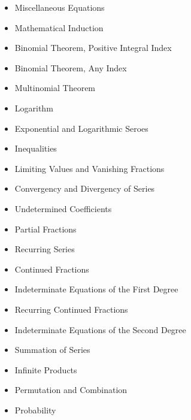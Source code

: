 \documentclass[aspectratio=169]{beamer}
\begin{document}
\begin{frame}
	\begin{itemize}
		\item Miscellaneous Equations
		\item Mathematical Induction
		\item Binomial Theorem, Positive Integral Index
		\item Binomial Theorem, Any Index
		\item Multinomial Theorem
		\item Logarithm
		\item Exponential and Logarithmic Seroes
		\item Inequalities
		\item Limiting Values and Vanishing Fractions
		\item Convergency and Divergency of Series
		\item Undetermined Coefficients
		\item Partial Fractions
		\item Recurring Series
		\item Continued Fractions
	\end{itemize}
\end{frame}
\begin{frame}
	\begin{itemize}
		\item Indeterminate Equations of the First Degree
		\item Recurring Continued Fractions
		\item Indeterminate Equations of the Second Degree
		\item Summation of Series
		\item Infinite Products
		\item Permutation and Combination
		\item Probability
	\end{itemize}
\end{frame}
\end{document}
